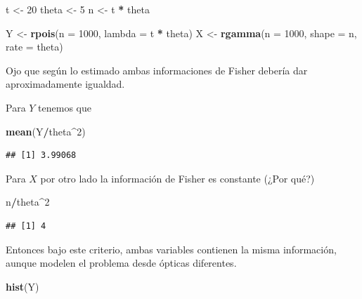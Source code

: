 \documentclass[
  12pt,
]{book}
\newenvironment{Shaded}{\begin{snugshade}}{\end{snugshade}}
\newcommand{\DataTypeTok}[1]{\textcolor[rgb]{0.13,0.29,0.53}{#1}}
\newcommand{\DecValTok}[1]{\textcolor[rgb]{0.00,0.00,0.81}{#1}}
\newcommand{\KeywordTok}[1]{\textcolor[rgb]{0.13,0.29,0.53}{\textbf{#1}}}
\newcommand{\NormalTok}[1]{#1}
\newcommand{\OperatorTok}[1]{\textcolor[rgb]{0.81,0.36,0.00}{\textbf{#1}}}
\newcommand{\StringTok}[1]{\textcolor[rgb]{0.31,0.60,0.02}{#1}}
\begin{document}
\begin{Shaded}
\begin{Highlighting}[]
\NormalTok{t \textless{}{-}}\StringTok{ }\DecValTok{20}
\NormalTok{theta \textless{}{-}}\StringTok{ }\DecValTok{5}
\NormalTok{n \textless{}{-}}\StringTok{ }\NormalTok{t }\OperatorTok{*}\StringTok{ }\NormalTok{theta}

\NormalTok{Y \textless{}{-}}\StringTok{ }\KeywordTok{rpois}\NormalTok{(}\DataTypeTok{n =} \DecValTok{1000}\NormalTok{, }\DataTypeTok{lambda =}\NormalTok{ t }\OperatorTok{*}\StringTok{ }\NormalTok{theta)}
\NormalTok{X \textless{}{-}}\StringTok{ }\KeywordTok{rgamma}\NormalTok{(}\DataTypeTok{n =} \DecValTok{1000}\NormalTok{, }\DataTypeTok{shape =}\NormalTok{ n, }\DataTypeTok{rate =}\NormalTok{ theta)}
\end{Highlighting}
\end{Shaded}

Ojo que según lo estimado ambas informaciones de Fisher debería dar
aproximadamente igualdad.

Para \(Y\) tenemos que

\begin{Shaded}
\begin{Highlighting}[]
\KeywordTok{mean}\NormalTok{(Y}\OperatorTok{/}\NormalTok{theta}\OperatorTok{\^{}}\DecValTok{2}\NormalTok{)}
\end{Highlighting}
\end{Shaded}

\begin{verbatim}
## [1] 3.99068
\end{verbatim}

Para \(X\) por otro lado la información de Fisher es constante (¿Por qué?)

\begin{Shaded}
\begin{Highlighting}[]
\NormalTok{n}\OperatorTok{/}\NormalTok{theta}\OperatorTok{\^{}}\DecValTok{2}
\end{Highlighting}
\end{Shaded}

\begin{verbatim}
## [1] 4
\end{verbatim}

Entonces bajo este criterio, ambas variables contienen la misma información,
aunque modelen el problema desde ópticas diferentes.

\begin{Shaded}
\begin{Highlighting}[]
\KeywordTok{hist}\NormalTok{(Y)}
\end{Highlighting}
\end{Shaded}
\end{document}
